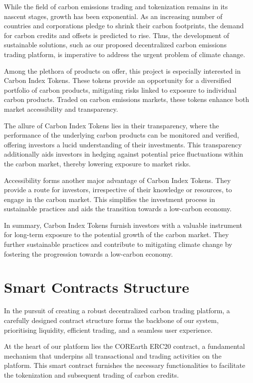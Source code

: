 \documentclass[sigconf, authordraft]{acmart}
\begin{document}
	While the field of carbon emissions trading and tokenization remains in its nascent
	stages, growth has been exponential. As an increasing number of countries and corporations
	pledge to shrink their carbon footprints, the demand for carbon credits and
	offsets is predicted to rise. Thus, the development of sustainable solutions, such
	as our proposed decentralized carbon emissions trading platform, is imperative
	to address the urgent problem of climate change.

	Among the plethora of products on offer, this project is especially interested
	in Carbon Index Tokens. These tokens provide an opportunity for a diversified
	portfolio of carbon products, mitigating risks linked to exposure to individual
	carbon products. Traded on carbon emissions markets, these tokens enhance both
	market accessibility and transparency.

	The allure of Carbon Index Tokens lies in their transparency, where the
	performance of the underlying carbon products can be monitored and verified, offering
	investors a lucid understanding of their investments. This transparency
	additionally aids investors in hedging against potential price fluctuations
	within the carbon market, thereby lowering exposure to market risks.

	Accessibility forms another major advantage of Carbon Index Tokens. They
	provide a route for investors, irrespective of their knowledge or resources,
	to engage in the carbon market. This simplifies the investment process in sustainable
	practices and aids the transition towards a low-carbon economy.

	In summary, Carbon Index Tokens furnish investors with a valuable instrument
	for long-term exposure to the potential growth of the carbon market. They further
	sustainable practices and contribute to mitigating climate change by fostering
	the progression towards a low-carbon economy.

	\section{Smart Contracts Structure }


	In the pursuit of creating a robust decentralized carbon trading platform, a
	carefully designed contract structure forms the backbone of our system, prioritising
	liquidity, efficient trading, and a seamless user experience.

	At the heart of our platform lies the COREarth ERC20 contract, a fundamental
	mechanism that underpins all transactional and trading activities on the
	platform. This smart contract furnishes the necessary functionalities to facilitate
	the tokenization and subsequent trading of carbon credits.
\end{document}
